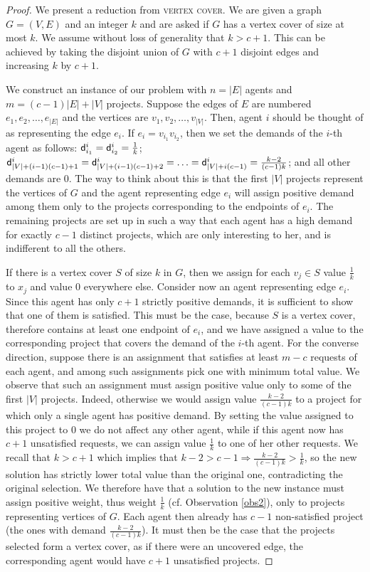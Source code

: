 \documentclass{article}
\begin{document}
\begin{proof} We present a reduction from \textsc{vertex cover}. We are given a graph
$G=(V,E)$ and an integer $k$ and are asked if $G$ has a vertex cover of size at
most $k$. We assume without loss of generality that $k> c+1$. This can be achieved by taking the disjoint
union of $G$ with $c+1$ disjoint edges and increasing $k$ by $c+1$.

We construct an instance of our problem with $n=|E|$ agents and $m=(c-1)|E|+|V|$
projects. Suppose the edges of $E$ are numbered $e_1,e_2,\ldots,e_{|E|}$ and
the vertices are $v_1,v_2,\ldots,v_{|V|}$. Then, agent $i$ should be thought of as
representing the edge $e_i$. If $e_i=v_{i_1}v_{i_2}$, then we set the demands of the
$i$-th agent as follows: ${\sf d}_{i_1}^i={\sf d}_{i_2}^i=\frac{1}{k}$; 
${\sf d}_{|V|+(i-1)(c-1)+1}^i={\sf d}_{|V|+(i-1)(c-1)+2}^i=\ldots={\sf d}_{|V|+i(c-1)}^i=\frac{k-2}{(c-1)k}$; and all other demands are $0$. The way to think
about this is that the first $|V|$ projects represent the vertices of $G$ and
the agent representing edge $e_i$ will assign positive demand among them only to the projects
corresponding to the endpoints of $e_i$. The remaining projects are set up in
such a way that each agent has a high demand for exactly $c-1$ distinct projects, which are only interesting to her,
and is indifferent to all the others.

If there is a vertex cover $S$ of size $k$ in $G$, then we assign for each $v_j\in S$
value $\frac{1}{k}$ to $x_j$ and value $0$ everywhere else. Consider now an
agent representing edge $e_i$. Since this agent has only $c+1$ strictly
positive demands, it is sufficient to show that one of them is satisfied.
This must be the case, because $S$ is a vertex cover, therefore contains at
least one endpoint of $e_i$, and we have assigned a value to the corresponding
project that covers the demand of the $i$-th agent. For the converse direction, suppose there is an assignment that satisfies at least $m-c$ requests of each agent, and among such assignments pick one with minimum total value. We observe that such an assignment must assign positive value only to some of the first $|V|$ projects. Indeed, otherwise we would assign value $\frac{k-2}{(c-1)k}$ to a project for which only a single agent has positive demand. By setting the value assigned to this project to $0$ we do not affect any other agent, while if this agent now has $c+1$ unsatisfied requests, we can assign value $\frac{1}{k}$ to one of her other requests. We recall that $k>c+1$ which implies that $k-2>c-1 \Rightarrow \frac{k-2}{(c-1)k} > \frac{1}{k}$, so the new solution has strictly lower total value than the original one, contradicting the original selection.
 We therefore have that a solution to the new instance must assign
positive weight, thus weight $\frac{1}{k}$ (cf. Observation \ref{obs2}), only to projects representing
vertices of $G$. Each agent then already has $c-1$ non-satisfied project (the ones
with demand $\frac{k-2}{(c-1)k}$). It must then be the case that the projects
selected form a vertex cover, as if there were an uncovered edge, the
corresponding agent would have $c+1$ unsatisfied projects.  \end{proof}
\end{document}
